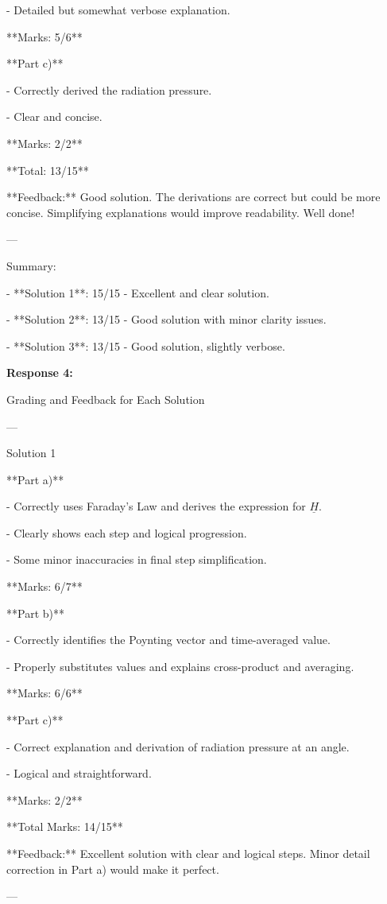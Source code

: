 \documentclass[a4paper,11pt]{article}
\begin{document}
- Detailed but somewhat verbose explanation.

**Marks: 5/6**

**Part c)**

- Correctly derived the radiation pressure.

- Clear and concise.

**Marks: 2/2**

**Total: 13/15**

**Feedback:** Good solution. The derivations are correct but could be more concise. Simplifying explanations would improve readability. Well done!

---

Summary:

- **Solution 1**: 15/15 - Excellent and clear solution.

- **Solution 2**: 13/15 - Good solution with minor clarity issues.

- **Solution 3**: 13/15 - Good solution, slightly verbose.

\bigskip
\textbf{Response 4:}

Grading and Feedback for Each Solution

---

Solution 1

**Part a)**

- Correctly uses Faraday's Law and derives the expression for \(\underline{H}\).

- Clearly shows each step and logical progression.

- Some minor inaccuracies in final step simplification.

**Marks: 6/7**

**Part b)**

- Correctly identifies the Poynting vector and time-averaged value.

- Properly substitutes values and explains cross-product and averaging.

**Marks: 6/6**

**Part c)**

- Correct explanation and derivation of radiation pressure at an angle.

- Logical and straightforward.

**Marks: 2/2**

**Total Marks: 14/15**

**Feedback:**
Excellent solution with clear and logical steps. Minor detail correction in Part a) would make it perfect.

---
\end{document}
